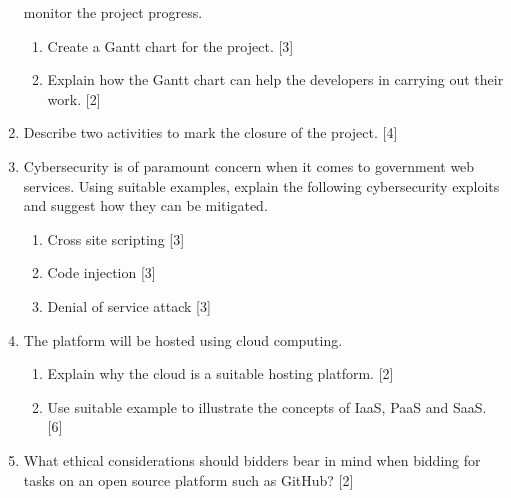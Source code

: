 \begin{enumerate}
monitor the project progress.
\begin{enumerate}
\item Create a Gantt chart for the project.\hfill{} {[}3{]}
\item Explain how the Gantt chart can help the developers in carrying out
their work.\hfill{} {[}2{]}
\end{enumerate}
\item Describe two activities to mark the closure of the project. \hfill{}{[}4{]}
\item Cybersecurity is of paramount concern when it comes to government
web services. Using suitable examples, explain the following cybersecurity
exploits and suggest how they can be mitigated. 
\begin{enumerate}
\item Cross site scripting \hfill{}{[}3{]}
\item Code injection \hfill{}{[}3{]}
\item Denial of service attack \hfill{}{[}3{]}
\end{enumerate}
\item The platform will be hosted using cloud computing. 
\begin{enumerate}
\item Explain why the cloud is a suitable hosting platform. \hfill{}{[}2{]}
\item Use suitable example to illustrate the concepts of IaaS, PaaS and
SaaS. \hfill{}{[}6{]}
\end{enumerate}
\item What ethical considerations should bidders bear in mind when bidding
for tasks on an open source platform such as GitHub?\hfill{} {[}2{]}
\end{enumerate}